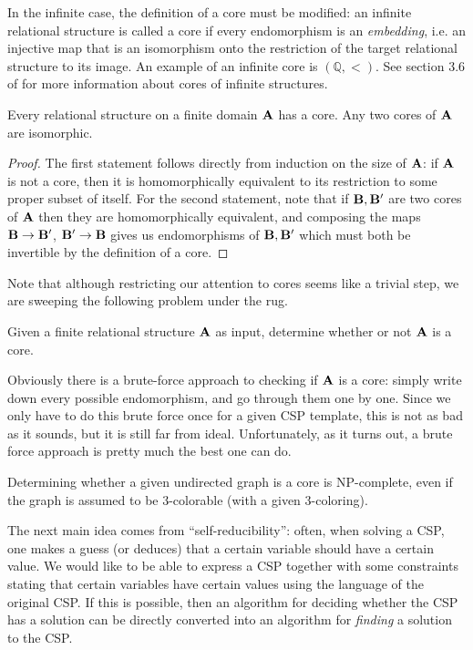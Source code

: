 \documentclass[letterpaper,11pt]{article}
\begin{document}
\begin{rem} In the infinite case, the definition of a core must be modified: an infinite relational structure is called a core if every endomorphism is an \emph{embedding}, i.e. an injective map that is an isomorphism onto the restriction of the target relational structure to its image. An example of an infinite core is $(\mathbb{Q},<)$. See section 3.6 of \cite{bodirsky-thesis} for more information about cores of infinite structures.
\end{rem}

\begin{prop} Every relational structure on a finite domain $\mathbf{A}$ has a core. Any two cores of $\mathbf{A}$ are isomorphic.
\end{prop}
\begin{proof} The first statement follows directly from induction on the size of $\mathbf{A}$: if $\mathbf{A}$ is not a core, then it is homomorphically equivalent to its restriction to some proper subset of itself. For the second statement, note that if $\mathbf{B}, \mathbf{B}'$ are two cores of $\mathbf{A}$ then they are homomorphically equivalent, and composing the maps $\mathbf{B} \rightarrow \mathbf{B}'$, $\mathbf{B}' \rightarrow \mathbf{B}$ gives us endomorphisms of $\mathbf{B}, \mathbf{B}'$ which must both be invertible by the definition of a core.
\end{proof}

Note that although restricting our attention to cores seems like a trivial step, we are sweeping the following problem under the rug.

\begin{prob} Given a finite relational structure $\mathbf{A}$ as input, determine whether or not $\mathbf{A}$ is a core.
\end{prob}

Obviously there is a brute-force approach to checking if $\mathbf{A}$ is a core: simply write down every possible endomorphism, and go through them one by one. Since we only have to do this brute force once for a given CSP template, this is not as bad as it sounds, but it is still far from ideal. Unfortunately, as it turns out, a brute force approach is pretty much the best one can do.

\begin{thm}  Determining whether a given undirected graph is a core is NP-complete, even if the graph is assumed to be $3$-colorable (with a given $3$-coloring).
\end{thm}

The next main idea comes from ``self-reducibility'': often, when solving a CSP, one makes a guess (or deduces) that a certain variable should have a certain value. We would like to be able to express a CSP together with some constraints stating that certain variables have certain values using the language of the original CSP. If this is possible, then an algorithm for deciding whether the CSP has a solution can be directly converted into an algorithm for \emph{finding} a solution to the CSP.
\end{document}
